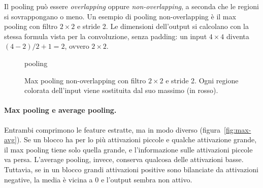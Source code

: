 Il pooling può essere \emph{overlapping} oppure \emph{non-overlapping}, a seconda che le regioni si sovrappongano o meno. Un esempio di pooling non-overlapping è il max pooling con filtro $2 \times 2$ e stride 2. Le dimensioni dell'output si calcolano con la stessa formula vista per la convoluzione, senza padding: un input $4 \times 4$ diventa $(4 - 2)/2 + 1 = 2$, ovvero $2 \times 2$.

\begin{figure}[htbp]
\centering
\begin{widget}{pooling}
\end{widget}
\caption{Max pooling non-overlapping con filtro $2 \times 2$ e stride 2. Ogni regione colorata dell'input viene sostituita dal suo massimo (in rosso).}
\label{fig:maxpool}
\end{figure}

\paragraph{Max pooling e average pooling.}
Entrambi comprimono le feature estratte, ma in modo diverso (figura~\ref{fig:max-avg}). Se un blocco ha per lo più attivazioni piccole e qualche attivazione grande, il max pooling tiene solo quella grande, e l'informazione sulle attivazioni piccole va persa. L'average pooling, invece, conserva qualcosa delle attivazioni basse. Tuttavia, se in un blocco grandi attivazioni positive sono bilanciate da attivazioni negative, la media è vicina a 0 e l'output sembra non attivo.

